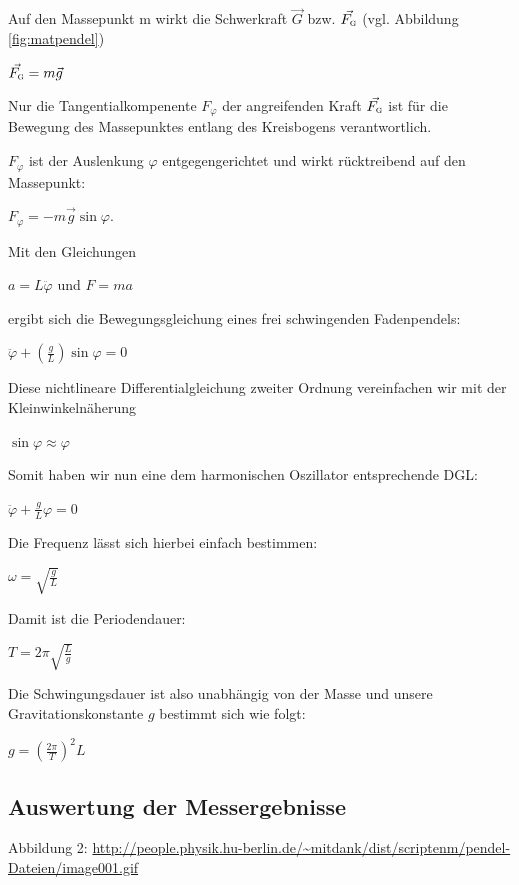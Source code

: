 \documentclass[11pt,a4paper,titlepage, ngerman]{article}
\begin{document}
			Auf den Massepunkt m wirkt die Schwerkraft $ \vec{G}$ bzw. $ \vec{F_\textsc{g}}$ (vgl. Abbildung \ref{fig:matpendel}) \\
			
			\begin{center}
				{ $ \vec{F_\textsc{g}} = m\vec{g}$} 
			\end{center}
			
			Nur die Tangentialkompenente $F_\varphi$ der angreifenden Kraft $ \vec{F_\textsc{g}}$ ist für die Bewegung des Massepunktes entlang des Kreisbogens verantwortlich.   	
			  
			$F_\varphi$ ist der Auslenkung $\varphi$ entgegengerichtet und wirkt  rücktreibend auf den Massepunkt:
			
			\begin{center}  
				$F_\varphi = - m\vec{g} \sin\varphi.$ 
			\end{center}
			
			Mit den Gleichungen 
			\begin{center}
				$a = L \ddot{\varphi}$ und $F = ma$ 
			\end{center}
		
			ergibt sich die Bewegungsgleichung eines frei schwingenden Fadenpendels: 
			\begin{center}
				$\ddot{\varphi}+\left( \frac{g}{L}\right)  \sin \varphi = 0$	
			\end{center}
			
			Diese nichtlineare Differentialgleichung zweiter Ordnung vereinfachen wir mit der Kleinwinkelnäherung
			\begin{center}
				$\sin \varphi \approx \varphi $	
			\end{center} 
			
			Somit haben wir nun eine dem harmonischen Oszillator entsprechende DGL:
			\begin{center}
				$\ddot{\varphi}+\frac{g}{L} \varphi = 0$	
			\end{center}
			
			Die Frequenz lässt sich hierbei einfach bestimmen: 
			\begin{center}
				$\omega =  \sqrt{\frac{g}{L}}$
			\end{center}
			
			Damit ist die Periodendauer:
			\begin{center}
				$T =  2\pi \sqrt{\frac{L}{g}}$
			\end{center} 
		
			Die Schwingungsdauer ist also unabhängig von der Masse und unsere Gravitationskonstante $g$ bestimmt sich wie folgt:
			\begin{center}
				$g = (\frac{2 \pi}{T})^2 L$
			\end{center} 
		
		\subsection{Auswertung der Messergebnisse}
		\label{Auswertung}
		
		
		
		\begin{thebibliography}{9}		
			\item[Abbildung 2:] \url{http://people.physik.hu-berlin.de/~mitdank/dist/scriptenm/pendel-Dateien/image001.gif}			
		\end{thebibliography}	
			
\end{document}
